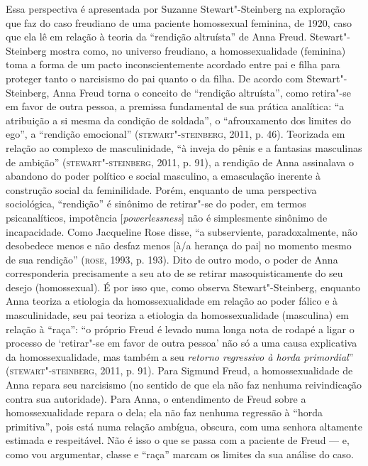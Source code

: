 Essa perspectiva é apresentada por Suzanne Stewart"-Steinberg na
exploração que faz do caso freudiano de uma paciente homossexual
feminina, de 1920, caso que ela lê em relação à teoria da ``rendição
altruísta'' de Anna Freud. Stewart"-Steinberg mostra como, no universo
freudiano, a homossexualidade (feminina) toma a forma de um pacto
inconscientemente acordado entre pai e filha para proteger tanto o
narcisismo do pai quanto o da filha. De acordo com Stewart"-Steinberg,
Anna Freud torna o conceito de ``rendição altruísta'', como retira"-se em
favor de outra pessoa, a premissa fundamental de sua prática analítica:
``a atribuição a si mesma da condição de soldada'', o ``afrouxamento dos
limites do ego'', a ``rendição emocional'' (\textsc{stewart"-steinberg}, 2011, p. 46).
Teorizada em relação ao complexo de masculinidade, ``à inveja do pênis e
a fantasias masculinas de ambição'' (\textsc{stewart"-steinberg}, 2011, p. 91), a
rendição de Anna assinalava o abandono do poder político e social
masculino, a emasculação inerente à construção social da feminilidade.
Porém, enquanto de uma perspectiva sociológica, ``rendição'' é sinônimo de
retirar"-se do poder, em termos psicanalíticos, impotência
{[}\emph{powerlessness}{]} não é simplesmente sinônimo de incapacidade.
Como Jacqueline Rose disse, ``a subserviente, paradoxalmente, não
desobedece menos e não desfaz menos {[}à/a herança do pai{]} no momento
mesmo de sua rendição'' (\textsc{rose}, 1993, p. 193). Dito de outro modo, o poder de
Anna corresponderia precisamente a seu ato de se retirar
masoquisticamente do seu desejo (homossexual). É por isso que, como
observa Stewart"-Steinberg, enquanto Anna teoriza a etiologia da
homossexualidade em relação ao poder fálico e à masculinidade, seu pai
teoriza a etiologia da homossexualidade (masculina) em relação à ``raça'':
``o próprio Freud é levado numa longa nota de rodapé a ligar o processo
de `retirar"-se em favor de outra pessoa' não só a uma causa explicativa
da homossexualidade, mas também a seu \emph{retorno regressivo à horda
primordial}'' (\textsc{stewart"-steinberg}, 2011, p. 91). Para Sigmund Freud, a
homossexualidade de Anna repara seu narcisismo (no sentido de que ela
não faz nenhuma reivindicação contra sua autoridade). Para Anna, o
entendimento de Freud sobre a homossexualidade repara o dela; ela não
faz nenhuma regressão à ``horda primitiva'', pois está numa relação
ambígua, obscura, com uma senhora altamente estimada e respeitável. Não
é isso o que se passa com a paciente de Freud --- e, como vou argumentar,
classe e ``raça'' marcam os limites da sua análise do caso.

